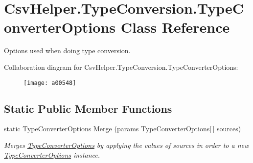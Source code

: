 \hypertarget{a00158}{\section{Csv\-Helper.\-Type\-Conversion.\-Type\-Converter\-Options Class Reference}
\label{a00158}
}


Options used when doing type conversion.  




Collaboration diagram for Csv\-Helper.\-Type\-Conversion.\-Type\-Converter\-Options\-:
\nopagebreak
\begin{figure}[H]
\begin{center}
\leavevmode
\texttt{[image: a00548]}
\end{center}
\end{figure}
\subsection*{Static Public Member Functions}
\begin{DoxyCompactItemize}
\item 
static \hyperlink{a00158}{Type\-Converter\-Options} \hyperlink{a00158_a0532694cffc600fe984e10c7f1375e0a}{Merge} (params \hyperlink{a00158}{Type\-Converter\-Options}\mbox{[}$\,$\mbox{]} sources)
\begin{DoxyCompactList}\small\item\em Merges \hyperlink{a00158}{Type\-Converter\-Options} by applying the values of sources in order to a new \hyperlink{a00158}{Type\-Converter\-Options} instance. \end{DoxyCompactList}\end{DoxyCompactItemize}
